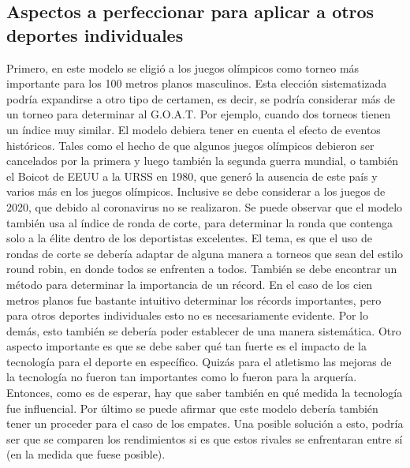 \documentclass[a4paper]{article}
\begin{document}
\subsection{Aspectos a perfeccionar para aplicar a otros deportes individuales
}
Primero,  en este modelo se eligió a los juegos olímpicos como torneo más importante para los 100 metros planos masculinos. Esta elección sistematizada podría expandirse a otro tipo de certamen, es decir, se podría considerar más de un torneo para determinar al G.O.A.T. Por ejemplo, cuando dos torneos tienen un índice muy similar. 
\newline\newline El modelo debiera tener en cuenta el efecto de eventos históricos. Tales como el hecho de que algunos juegos olímpicos debieron ser cancelados por la primera y luego también la segunda guerra mundial, o también el Boicot de EEUU a la URSS en 1980, que generó la ausencia de este país y varios más en los juegos olímpicos. Inclusive se debe considerar a los juegos de 2020, que debido al coronavirus no se realizaron.
\newline\newline Se puede observar que el modelo también usa al índice de ronda de corte, para determinar la ronda  que contenga solo a la élite dentro de los deportistas excelentes. El tema, es que el uso de rondas de corte se debería adaptar de alguna manera a torneos que sean del estilo round robin, en donde todos se enfrenten a todos.  \newline\newline También se debe encontrar un método para determinar la importancia de un récord. En el caso de los cien metros planos fue bastante intuitivo determinar los récords importantes, pero para otros deportes individuales esto no es necesariamente evidente. Por lo demás, esto también se debería poder establecer de una manera sistemática. 
\newline\newline Otro aspecto importante es que se debe saber qué tan fuerte es el impacto de la tecnología para el deporte en específico. Quizás para el atletismo las mejoras de la tecnología no fueron tan importantes como lo fueron para la arquería. Entonces, como es de esperar, hay que saber también en qué medida la tecnología fue influencial. \newline \newline Por último se puede afirmar que este modelo debería también tener un proceder para el caso de los empates. Una posible solución a esto, podría ser que se comparen los rendimientos si es que estos rivales se enfrentaran entre sí (en la medida que fuese posible). 
\end{document}
